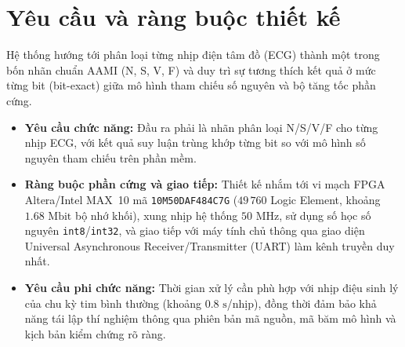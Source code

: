 \section{Yêu cầu và ràng buộc thiết kế}\label{sec:yeucau}

Hệ thống hướng tới phân loại từng nhịp điện tâm đồ (ECG) thành một trong bốn nhãn chuẩn AAMI (N, S, V, F) và duy trì sự tương thích kết quả ở mức từng bit (bit-exact) giữa mô hình tham chiếu số nguyên và bộ tăng tốc phần cứng.

\begin{itemize}
	\item \textbf{Yêu cầu chức năng:} Đầu ra phải là nhãn phân loại N/S/V/F cho từng nhịp ECG, với kết quả suy luận trùng khớp từng bit so với mô hình số nguyên tham chiếu trên phần mềm.
	\item \textbf{Ràng buộc phần cứng và giao tiếp:} Thiết kế nhắm tới vi mạch FPGA Altera/Intel MAX~10 mã \texttt{10M50DAF484C7G} ($49\,760$ Logic Element, khoảng $1.68\text{ Mbit}$ bộ nhớ khối), xung nhịp hệ thống $50\text{ MHz}$, sử dụng số học số nguyên \texttt{int8}/\texttt{int32}, và giao tiếp với máy tính chủ thông qua giao diện Universal Asynchronous Receiver/Transmitter (UART) làm kênh truyền duy nhất.
	\item \textbf{Yêu cầu phi chức năng:} Thời gian xử lý cần phù hợp với nhịp điệu sinh lý của chu kỳ tim bình thường (khoảng $0.8\text{ s}$/nhịp), đồng thời đảm bảo khả năng tái lập thí nghiệm thông qua phiên bản mã nguồn, mã băm mô hình và kịch bản kiểm chứng rõ ràng.
\end{itemize}
